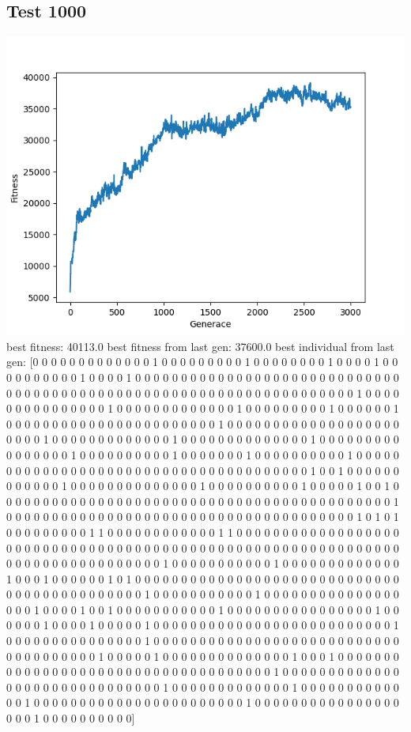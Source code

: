 \documentclass{article}
\begin{document}
\subsection*{Test 1000}
\includegraphics{Figure_1.png}
best fitness:  40113.0
best fitness from last gen:  37600.0
best individual from last gen:  [0 0 0 0 0 0 0 0 0 0 0 0 0 1 0 0 0 0 0 0 0 0 0 1 0 0 0 0 0 0 0 0 1 0 0 0 0
 1 0 0 0 0 0 0 0 0 0 0 1 0 0 0 0 1 0 0 0 0 0 0 0 0 0 0 0 0 0 0 0 0 0 0 0 0
 0 0 0 0 0 0 0 0 0 0 0 0 0 0 0 0 0 0 0 0 0 0 0 0 0 0 0 0 0 0 0 0 0 0 0 0 0
 0 0 0 0 0 0 0 0 0 0 1 0 0 0 0 0 0 0 0 0 0 0 0 0 0 0 1 0 0 0 0 0 0 0 0 0 0
 0 0 0 1 0 0 0 0 0 0 0 0 0 1 0 0 0 0 0 0 1 0 0 0 0 0 0 0 0 0 0 0 0 0 0 0 0
 0 0 0 0 0 0 0 1 0 0 0 0 0 0 0 0 0 0 0 0 0 0 0 0 0 0 0 0 0 0 0 1 0 0 0 0 0
 0 0 0 0 0 0 0 0 1 0 0 0 0 0 0 0 0 0 0 0 0 0 0 1 0 0 0 0 0 0 0 0 0 0 0 0 0
 0 0 0 1 0 0 0 0 0 0 0 0 0 0 1 0 0 0 0 0 0 0 1 0 0 0 0 0 0 0 0 0 0 1 0 0 0
 0 0 0 0 0 0 0 0 0 0 0 0 0 0 0 0 0 0 0 0 0 0 0 0 0 0 0 0 0 0 0 0 0 0 0 1 0
 0 1 0 0 0 0 0 0 0 0 0 0 0 0 1 0 0 0 0 0 0 0 0 0 0 0 0 0 0 1 0 0 0 0 0 0 0
 0 0 0 1 0 0 0 0 0 1 0 0 1 0 0 0 0 0 0 0 0 0 0 0 0 0 0 0 0 0 0 0 0 0 0 0 0
 0 0 0 0 0 0 0 0 0 0 0 0 0 0 0 0 0 0 0 1 0 0 0 0 0 0 0 0 0 0 0 0 0 0 0 0 0
 0 0 0 0 0 0 0 0 0 0 0 0 0 0 0 0 0 0 0 0 0 1 0 1 0 1 0 0 0 0 0 0 0 0 0 1 1
 0 0 0 0 0 0 0 0 0 0 0 0 1 1 0 0 0 0 0 0 0 0 0 0 0 0 0 0 0 0 0 0 0 0 0 0 0
 0 0 0 0 0 0 0 0 0 0 0 0 0 0 0 0 0 0 0 0 0 0 0 0 0 0 0 0 0 0 0 0 0 0 0 0 0
 0 0 0 0 0 0 0 0 0 0 0 0 0 0 0 0 0 0 1 0 0 0 0 0 0 0 0 0 0 0 1 0 0 0 0 0 0
 0 0 0 0 0 0 0 1 0 0 0 1 0 0 0 0 0 0 1 0 1 0 0 0 0 0 0 0 0 0 0 0 0 0 0 0 0
 0 0 0 0 0 0 0 0 0 0 0 0 0 0 0 0 0 0 0 0 0 0 0 0 0 0 0 0 1 0 0 0 0 0 0 0 0
 0 0 0 1 0 0 0 0 0 0 0 0 0 0 0 0 0 0 0 0 0 0 1 0 0 0 0 1 0 0 1 0 0 0 0 0 0
 0 0 0 0 0 1 0 0 0 0 0 0 0 0 0 0 0 0 0 0 0 0 1 0 0 0 0 0 0 1 0 0 0 0 1 0 0
 0 0 0 1 0 0 0 0 0 0 0 0 0 0 0 0 0 0 0 0 0 0 0 0 0 0 0 0 0 0 1 0 0 0 0 0 0
 0 0 0 0 0 0 0 0 0 1 0 0 0 0 0 0 0 0 0 0 0 0 0 0 0 0 0 0 0 0 0 0 0 0 0 0 0
 0 0 0 0 0 0 0 0 0 0 1 0 0 0 0 0 1 0 0 0 0 0 0 0 0 0 0 0 0 0 0 1 0 0 0 1 0
 0 0 0 0 0 0 0 0 0 0 0 0 0 0 0 0 0 0 0 0 0 0 0 0 0 0 0 0 0 0 0 0 0 0 0 1 0
 0 0 0 0 0 0 0 0 0 0 0 0 0 0 0 0 0 0 0 0 0 0 0 0 0 0 0 0 0 1 0 0 0 0 0 0 0
 0 0 0 0 0 0 1 0 0 0 0 0 0 0 0 0 0 0 0 0 1 0 0 0 0 0 0 0 0 0 0 0 0 0 0 0 0
 0 0 0 0 0 0 0 1 0 0 0 0 0 0 0 0 0 0 0 0 0 0 0 0 0 0 0 1 0 0 0 0 0 0 0 0 0
 0]
\end{document}
